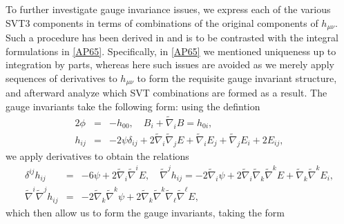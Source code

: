 To further investigate gauge invariance issues, we express each of the various SVT3 components in terms  of combinations of the original components of $h_{\mu\nu}$. Such a procedure has been derived in \cite{amarasinghe_2019} and is to be contrasted with the integral formulations in \eqref{AP65}. Specifically, in \eqref{AP65} we mentioned uniqueness up to integration by parts, whereas here such issues are avoided as we merely apply sequences of derivatives to $h_{\mu\nu}$ to form the requisite gauge invariant structure, and afterward analyze which SVT combinations are formed as a result. The gauge invariants take the following form: using the defintion
%
\begin{eqnarray}
2\phi&=&-h_{00},\quad B_i+\tilde{\nabla}_iB=h_{0i},
\nonumber\\
h_{ij}&=&-2\psi\delta_{ij} +2\tilde{\nabla}_i\tilde{\nabla}_j E + \tilde{\nabla}_i E_j + \tilde{\nabla}_j E_i + 2E_{ij},
\label{2.4}
\end{eqnarray}
%
we apply derivatives to obtain the relations
%
\begin{eqnarray}
\delta^{ij}h_{ij}&=&-6\psi+2\tilde{\nabla}_i\tilde{\nabla}^iE,\quad
\tilde{\nabla}^jh_{ij}=-2\tilde{\nabla}_i\psi+2\tilde{\nabla}_i\tilde{\nabla}_k\tilde{\nabla}^kE+\tilde{\nabla}_k\tilde{\nabla}^kE_{i},
\nonumber\\
\tilde{\nabla}^i \tilde{\nabla}^jh_{ij}&=&-2\tilde{\nabla}_k\tilde{\nabla}^k\psi+2\tilde{\nabla}_k\tilde{\nabla}^k\tilde{\nabla}_{\ell}\tilde{\nabla}^{\ell}E,
\label{2.5}
\end{eqnarray}
%
which then allow us to form the gauge invariants, taking the form
%
